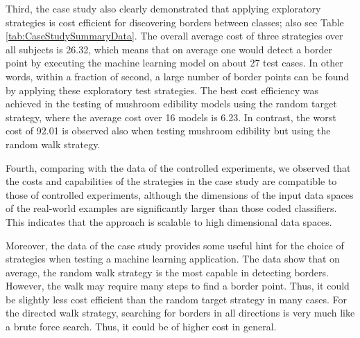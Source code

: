 \documentclass[preprint,1p,authoryear,times]{elsarticle}
\begin{document}

Third, the case study also clearly demonstrated that applying exploratory strategies is cost efficient for discovering borders between classes; also see Table \ref{tab:CaseStudySummaryData}. The overall average cost of three strategies over all subjects is 26.32, which means that on average one would detect a border point by executing the machine learning model on about 27 test cases. In other words, within a fraction of second, a large number of border points can be found by applying these exploratory test strategies. The best cost efficiency was achieved in the testing of mushroom edibility models using the random target strategy, where the average cost over 16 models is 6.23. In contrast, the worst cost of 92.01 is observed also when testing mushroom edibility but using the random walk strategy. 

Fourth, comparing with the data of the controlled experiments, we observed that the costs and capabilities of the strategies in the case study are compatible to those of controlled experiments, although the dimensions of the input data spaces of the real-world examples are significantly larger than those coded classifiers. This indicates that the approach is scalable to high dimensional data spaces.

Moreover, the data of the case study provides some useful hint for the choice of strategies when testing a machine learning application. The data show that on average, the random walk strategy is the most capable in detecting borders. However, the walk may require many steps to find a border point. Thus, it could be slightly less cost efficient than the random target strategy in many cases. For the directed walk strategy, searching for borders in all directions is very much like a brute force search. Thus, it could be of higher cost in general. 

\end{document}
